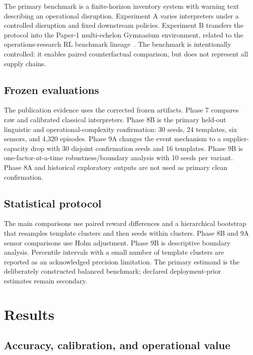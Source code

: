 \documentclass[10pt]{article}
\begin{document}
The primary benchmark is a finite-horizon inventory system with warning text describing an operational disruption. Experiment A varies interpreters under a controlled disruption and fixed downstream policies. Experiment B transfers the protocol into the Paper-1 multi-echelon Gymnasium environment, related to the operations-research RL benchmark lineage~\citep{hubbs2020orgym}. The benchmark is intentionally controlled: it enables paired counterfactual comparison, but does not represent all supply chains.

\subsection{Frozen evaluations}

The publication evidence uses the corrected frozen artifacts. Phase 7 compares raw and calibrated classical interpreters. Phase 8B is the primary held-out linguistic and operational-complexity confirmation: 30 seeds, 24 templates, six sensors, and 4,320 episodes. Phase 9A changes the event mechanism to a supplier-capacity drop with 30 disjoint confirmation seeds and 16 templates. Phase 9B is one-factor-at-a-time robustness/boundary analysis with 10 seeds per variant. Phase 8A and historical exploratory outputs are not used as primary clean confirmation.

\subsection{Statistical protocol}

The main comparisons use paired reward differences and a hierarchical bootstrap that resamples template clusters and then seeds within clusters. Phase 8B and 9A sensor comparisons use Holm adjustment. Phase 9B is descriptive boundary analysis. Percentile intervals with a small number of template clusters are reported as an acknowledged precision limitation. The primary estimand is the deliberately constructed balanced benchmark; declared deployment-prior estimates remain secondary.

\section{Results}

\subsection{Accuracy, calibration, and operational value}
\end{document}
